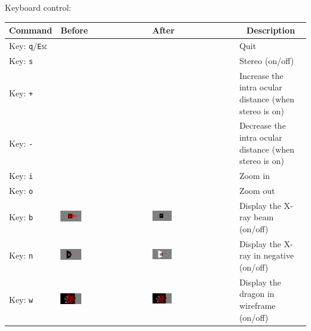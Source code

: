 \documentclass[10pt]{article}
\begin{document}
\newpage
Keyboard control:
\begin{center}
    \begin{longtable}{|m{}|m{}|m{}|m{}|}
		\hline
		\textbf{Command}	&	\textbf{Before}	&	\textbf{After}	&	\multicolumn{1}{c|}{\textbf{Description}}	\\
		\hline
		\hline
		Key: \texttt{q}/\textsc{\texttt{Esc}}	&		&		&	Quit\\
		\hline
		Key: \texttt{s}	&	&	&	Stereo (on/off)\\
		\hline
		Key: \texttt{+}	&	&	&	Increase the intra ocular distance (when stereo is on)\\
		\hline
		Key: \texttt{-}	&	&	&	Decrease the intra ocular distance (when stereo is on)\\
		\hline
		Key: \texttt{i}	&	&	&	Zoom in\\
		\hline
		Key: \texttt{o}	&	&	&	Zoom out\\
		\hline
		Key: \texttt{b}	&	\includegraphics[width=0.25\textwidth]{beam_on.png}	&	\includegraphics[width=0.25\textwidth]{beam_off.png}	&	Display the X-ray beam (on/off)\\
		\hline
		Key: \texttt{n}	&	\includegraphics[width=0.25\textwidth]{negative_on.png}	&	\includegraphics[width=0.25\textwidth]{negative_off.png}	&	Display the X-ray in negative (on/off)\\
		\hline
		Key: \texttt{w}	&	\includegraphics[width=0.25\textwidth]{solid_model.png}	&	\includegraphics[width=0.25\textwidth]{wireframe_model.png}	&	Display the dragon in wireframe (on/off)\\

\end{longtable}
\end{center}
\end{document}
